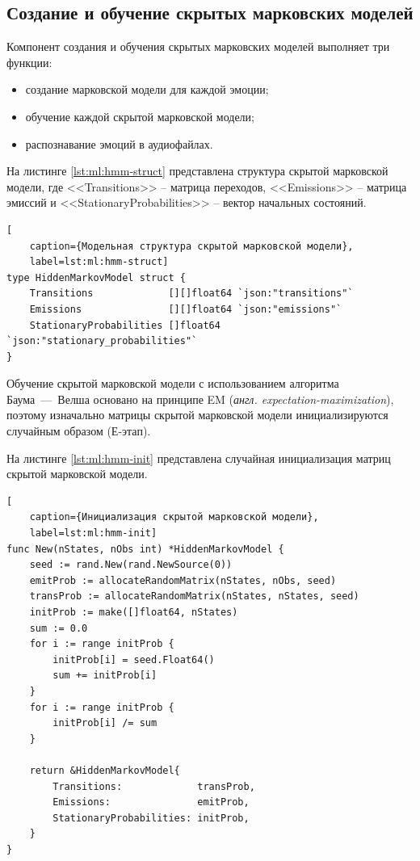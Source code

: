 \subsection{Создание и обучение скрытых марковских моделей}
Компонент создания и обучения скрытых марковских моделей выполняет три функции:
\begin{itemize}
	\item создание марковской модели для каждой эмоции;
	\item обучение каждой скрытой марковской модели;
	\item распознавание эмоций в аудиофайлах.
\end{itemize}
На листинге \ref{lst:ml:hmm-struct} представлена структура скрытой марковской модели, где <<Transitions>> -- матрица переходов, <<Emissions>> -- матрица эмиссий и <<StationaryProbabilities>> -- вектор начальных состояний.
\begin{lstlisting}[
	caption={Модельная структура скрытой марковской модели},
	label=lst:ml:hmm-struct]
type HiddenMarkovModel struct {
	Transitions             [][]float64 `json:"transitions"`
	Emissions               [][]float64 `json:"emissions"`
	StationaryProbabilities []float64   `json:"stationary_probabilities"`
}
\end{lstlisting}
Обучение скрытой марковской модели с использованием алгоритма Баума~---~Велша основано на принципе EM (\textit{англ. expectation-maximization}), поэтому изначально матрицы скрытой марковской модели инициализируются случайным образом (Е-этап).

На листинге \ref{lst:ml:hmm-init} представлена случайная инициализация матриц скрытой марковской модели.
\begin{lstlisting}[
	caption={Инициализация скрытой марковской модели},
	label=lst:ml:hmm-init]
func New(nStates, nObs int) *HiddenMarkovModel {
	seed := rand.New(rand.NewSource(0))
	emitProb := allocateRandomMatrix(nStates, nObs, seed)
	transProb := allocateRandomMatrix(nStates, nStates, seed)
	initProb := make([]float64, nStates)
	sum := 0.0
	for i := range initProb {
		initProb[i] = seed.Float64()
		sum += initProb[i]
	}
	for i := range initProb {
		initProb[i] /= sum
	}
	
	return &HiddenMarkovModel{
		Transitions:             transProb,
		Emissions:               emitProb,
		StationaryProbabilities: initProb,
	}
}
\end{lstlisting}

